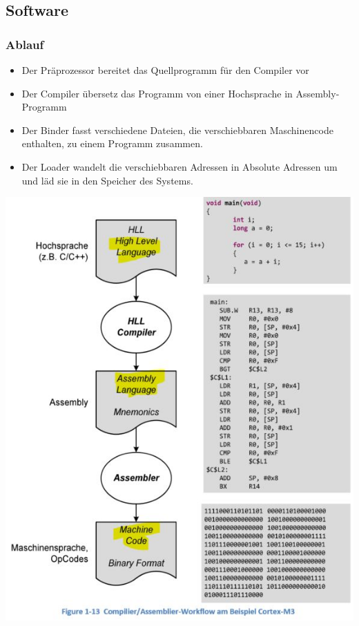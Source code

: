 \subsection{Software}
\begin{multicols}{2}
\subsubsection{Ablauf}
\begin{itemize}
    \item Der Präprozessor bereitet das Quellprogramm für den Compiler vor
    \item Der Compiler übersetz das Programm von einer Hochsprache in Assembly-Programm
    \item Der Binder fasst verschiedene Dateien, die verschiebbaren Maschinencode enthalten, zu einem Programm zusammen.
    \item Der Loader wandelt die verschiebbaren Adressen in Absolute Adressen um und läd sie in den Speicher des Systems.
\end{itemize}

\includegraphics[width=\linewidth]{images/CompilerWorkflow}
\end{multicols}
\clearpage





















    